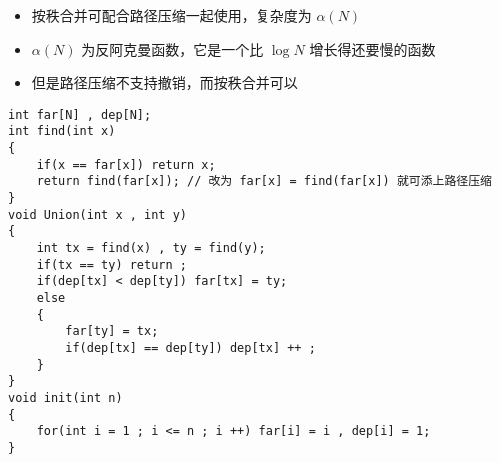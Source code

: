 \documentclass[E:/GsjzTle/main/main.tex]{subfiles}
\begin{document}
\begin{itemize}
\item
  按秩合并可配合路径压缩一起使用，复杂度为 \(\alpha(N)\)
\item
  \(\alpha(N)\) 为反阿克曼函数，它是一个比 \(\log N\) 增长得还要慢的函数
\item
  但是路径压缩不支持撤销，而按秩合并可以
\end{itemize}

\begin{lstlisting}
int far[N] , dep[N];
int find(int x)
{
	if(x == far[x]) return x;
	return find(far[x]); // 改为 far[x] = find(far[x]) 就可添上路径压缩
}
void Union(int x , int y)
{
	int tx = find(x) , ty = find(y);
	if(tx == ty) return ; 
	if(dep[tx] < dep[ty]) far[tx] = ty;
	else 
	{
		far[ty] = tx;
		if(dep[tx] == dep[ty]) dep[tx] ++ ;
	}
}
void init(int n)
{
	for(int i = 1 ; i <= n ; i ++) far[i] = i , dep[i] = 1;
}
\end{lstlisting}
\end{document}
